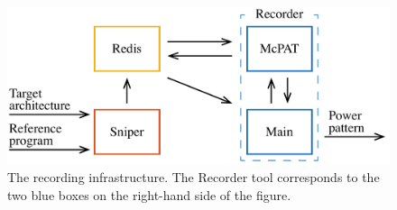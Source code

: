 \begin{figure}
  \centering
  \includegraphics[width=1.0\columnwidth]{include/assets/figures/recorder.pdf}
  \caption{
    The recording infrastructure. The Recorder tool corresponds to the two blue
    boxes on the right-hand side of the figure.
  }
\end{figure}
